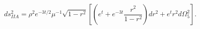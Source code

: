 \begin{equation}
ds^2_{IIA} = \rho^2e^{-3t/2}\mu^{-1}\sqrt{1-r^2}
        \left[ \left(e^t+e^{-3t}\frac{r^2}{1-r^2}\right)dr^2+e^tr^2d\Omega_5^2 \right].
\end{equation}

